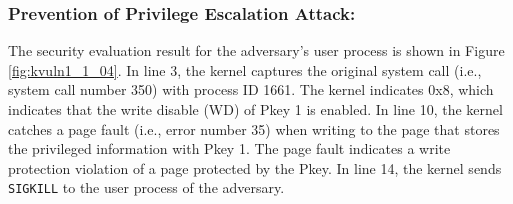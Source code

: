 \subsubsection{Prevention of Privilege Escalation Attack:}
The security evaluation result for the adversary's user process is shown in
Figure \ref{fig:kvuln1_1_04}.
In line 3, the kernel captures the original system call (i.e., system call
number 350) with process ID 1661. The kernel indicates 0x8, which indicates that
the write disable (WD) of Pkey 1 is enabled.
In line 10, the kernel catches a page fault (i.e., error number 35) when writing
to the page that stores the privileged information with Pkey 1. The page fault
indicates a write protection violation of a page protected by the Pkey. In line
14, the kernel sends \verb|SIGKILL| to the user process of the adversary.

%



